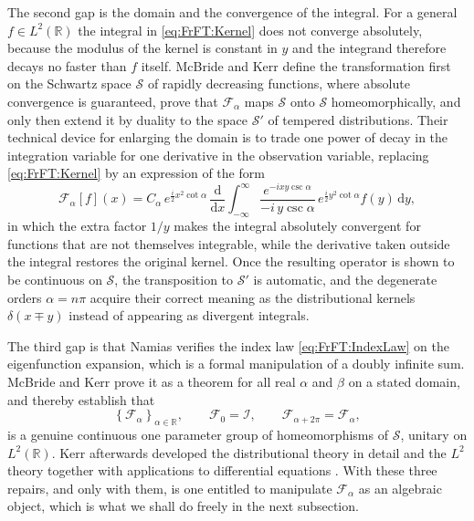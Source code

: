 			The second gap is the domain and the convergence of the integral. For a general $f\in L^{2}(\mathbb{R})$ the integral in \eqref{eq:FrFT:Kernel} does not converge absolutely, because the modulus of the kernel is constant in $y$ and the integrand therefore decays no faster than $f$ itself. McBride and Kerr define the transformation first on the Schwartz space $\mathcal{S}$ of rapidly decreasing functions, where absolute convergence is guaranteed, prove that $\mathcal{F}_{\alpha}$ maps $\mathcal{S}$ onto $\mathcal{S}$ homeomorphically, and only then extend it by duality to the space $\mathcal{S}'$ of tempered distributions. Their technical device for enlarging the domain is to trade one power of decay in the integration variable for one derivative in the observation variable, replacing \eqref{eq:FrFT:Kernel} by an expression of the form
			\begin{equation}\label{eq:FrFT:MKForm}
				\mathcal{F}_{\alpha}[f](x) = C_{\alpha}\,e^{\frac{i}{2}x^{2}\cot\alpha}\,\frac{\mathrm{d}}{\mathrm{d}x}\int_{-\infty}^{\infty}\frac{e^{-ixy\csc\alpha}}{-i\,y\csc\alpha}\,e^{\frac{i}{2}y^{2}\cot\alpha}f(y)\,\mathrm{d}y,
			\end{equation}
			in which the extra factor $1/y$ makes the integral absolutely convergent for functions that are not themselves integrable, while the derivative taken outside the integral restores the original kernel. Once the resulting operator is shown to be continuous on $\mathcal{S}$, the transposition to $\mathcal{S}'$ is automatic, and the degenerate orders $\alpha = n\pi$ acquire their correct meaning as the distributional kernels $\delta(x\mp y)$ instead of appearing as divergent integrals.

			The third gap is that Namias verifies the index law \eqref{eq:FrFT:IndexLaw} on the eigenfunction expansion, which is a formal manipulation of a doubly infinite sum. McBride and Kerr prove it as a theorem for all real $\alpha$ and $\beta$ on a stated domain, and thereby establish that
			\begin{equation}\label{eq:FrFT:Group}
				\left\{\mathcal{F}_{\alpha}\right\}_{\alpha\in\mathbb{R}}, \qquad \mathcal{F}_{0} = \mathcal{I}, \qquad \mathcal{F}_{\alpha+2\pi} = \mathcal{F}_{\alpha},
			\end{equation}
			is a genuine continuous one parameter group of homeomorphisms of $\mathcal{S}$, unitary on $L^{2}(\mathbb{R})$. Kerr afterwards developed the distributional theory in detail \citep{kerr1988distributional} and the $L^{2}$ theory together with applications to differential equations \citep{kerr1988namias}. With these three repairs, and only with them, is one entitled to manipulate $\mathcal{F}_{\alpha}$ as an algebraic object, which is what we shall do freely in the next subsection.


